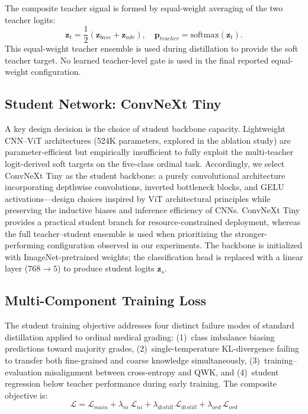 \documentclass[a4paper,fleqn]{cas-dc}
\begin{document}
              The composite teacher signal is formed by equal-weight averaging of the two teacher logits:
              \begin{equation}
                \mathbf{z}_t = \frac{1}{2}\!\left(\mathbf{z}_{base} + \mathbf{z}_{adv}\right), \quad
                \mathbf{p}_{teacher}=\mathrm{softmax}(\mathbf{z}_t).
                \end{equation}
                This equal-weight teacher ensemble is used during distillation to provide the soft teacher target. No learned teacher-level gate is used in the final reported equal-weight configuration.

                \subsection{Student Network: ConvNeXt Tiny}

                A key design decision is the choice of student backbone capacity. Lightweight CNN--ViT architectures (524K parameters, explored in the ablation study) are parameter-efficient but empirically insufficient to fully exploit the multi-teacher logit-derived soft targets on the five-class ordinal task. Accordingly, we select ConvNeXt Tiny \cite{liu2022} as the student backbone: a purely convolutional architecture incorporating depthwise convolutions, inverted bottleneck blocks, and GELU activations---design choices inspired by ViT architectural principles while preserving the inductive biases and inference efficiency of CNNs. ConvNeXt Tiny provides a practical student branch for resource-constrained deployment, whereas the full teacher--student ensemble is used when prioritizing the stronger-performing configuration observed in our experiments. The backbone is initialized with ImageNet-pretrained weights; the classification head is replaced with a linear layer ($768{\to}5$) to produce student logits $\mathbf{z}_s$.

                \subsection{Multi-Component Training Loss}

                The student training objective addresses four distinct failure modes of standard distillation applied to ordinal medical grading: (1)~class imbalance biasing predictions toward majority grades, (2)~single-temperature KL-divergence failing to transfer both fine-grained and coarse knowledge simultaneously, (3)~training--evaluation misalignment between cross-entropy and QWK, and (4)~student regression below teacher performance during early training. The composite objective is:
                \begin{equation}
                  \mathcal{L} = \mathcal{L}_{main} + \lambda_{ni}\,\mathcal{L}_{ni} +
                    \lambda_{distill}\,\mathcal{L}_{distill} + \lambda_{ord}\,\mathcal{L}_{ord}
                    \end{equation}
\end{document}
